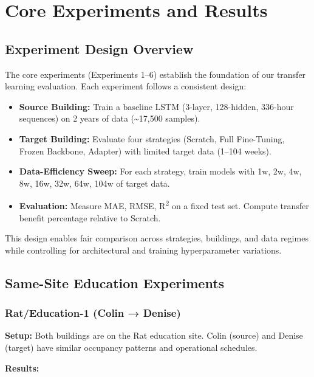 \documentclass[12pt,a4paper]{report}
\begin{document}
\chapter{Core Experiments and Results}

\section{Experiment Design Overview}

The core experiments (Experiments 1--6) establish the foundation of our transfer learning evaluation. Each experiment follows a consistent design:

\begin{itemize}
    \item \textbf{Source Building:} Train a baseline LSTM (3-layer, 128-hidden, 336-hour sequences) on 2 years of data (\textasciitilde17,500 samples).
    \item \textbf{Target Building:} Evaluate four strategies (Scratch, Full Fine-Tuning, Frozen Backbone, Adapter) with limited target data (1--104 weeks).
    \item \textbf{Data-Efficiency Sweep:} For each strategy, train models with 1w, 2w, 4w, 8w, 16w, 32w, 64w, 104w of target data.
    \item \textbf{Evaluation:} Measure MAE, RMSE, R\textsuperscript{2} on a fixed test set. Compute transfer benefit percentage relative to Scratch.
\end{itemize}

This design enables fair comparison across strategies, buildings, and data regimes while controlling for architectural and training hyperparameter variations.

\section{Same-Site Education Experiments}

\subsection{Rat/Education-1 (Colin → Denise)}

\textbf{Setup:} Both buildings are on the Rat education site. Colin (source) and Denise (target) have similar occupancy patterns and operational schedules.

\textbf{Results:}
\end{document}
